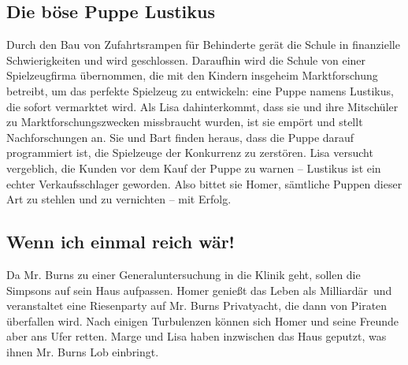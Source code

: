 \subsection{Die böse Puppe Lustikus}\label{BABF07}
Durch den Bau von Zufahrtsrampen für Behinderte gerät die Schule in finanzielle Schwierigkeiten und wird geschlossen. Daraufhin wird die Schule von einer Spielzeugfirma übernommen, die mit den Kindern insgeheim Marktforschung betreibt, um das perfekte Spielzeug zu entwickeln: eine Puppe namens Lustikus, die sofort vermarktet wird. Als Lisa dahinterkommt, dass sie und ihre Mitschüler zu Marktforschungszwecken missbraucht wurden, ist sie empört und stellt Nachforschungen an. Sie und Bart finden heraus, dass die Puppe darauf programmiert ist, die Spielzeuge der Konkurrenz zu zerstören. Lisa versucht vergeblich, die Kunden vor dem Kauf der Puppe zu warnen -- Lustikus ist ein echter Verkaufsschlager geworden. Also bittet sie Homer, sämtliche Puppen dieser Art zu stehlen und zu vernichten -- mit Erfolg. 


	
\subsection{Wenn ich einmal reich wär!}\label{BABF08}
Da Mr. Burns zu einer Generaluntersuchung in die Klinik geht, sollen die Simpsons auf sein Haus aufpassen. Homer genießt das Leben als \glqq Milliardär\grqq\ und veranstaltet eine Riesenparty auf Mr. Burns Privatyacht, die dann von Piraten überfallen wird. Nach einigen Turbulenzen können sich Homer und seine Freunde aber ans Ufer retten. Marge und Lisa haben inzwischen das Haus geputzt, was ihnen Mr. Burns Lob einbringt.


